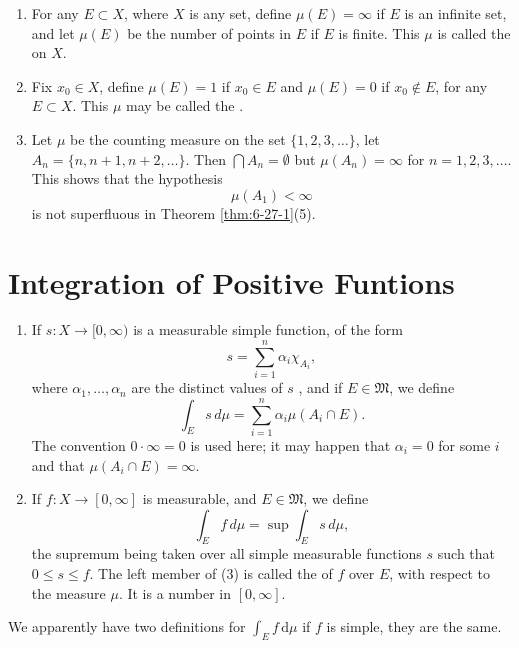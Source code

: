 \documentclass[../main.tex]{subfiles}
\begin{document}
\begin{example}{}{}
    \begin{enumerate}
\item For any $E \subset X$, where $X$ is any set, define $\mu(E) = \infty$ if $E$ is an infinite set, and let $\mu(E)$ be the number of points in $E$ if $E$ is finite. This $\mu$ is called the  on $X$.
\item Fix $x_0 \in X$, define $\mu(E) = 1$ if $x_0 \in E$ and $\mu(E) = 0$ if $x_0 \notin E$, for any $E \subset X$. This $\mu$ may be called the .
\item Let $\mu$ be the counting measure on the set $\{1, 2, 3, \dots\}$, let $A_n = \{n, n + 1, n + 2, \dots\}$. Then $\bigcap A_n = \emptyset$ but $\mu(A_n) = \infty$ for $n = 1, 2, 3, \dots$. This shows that the hypothesis
\[ \mu(A_1) < \infty \]
is not superfluous in Theorem \ref{thm:6-27-1}(5).
\end{enumerate}
\end{example}
\section{Integration of Positive Funtions}


\begin{definition}{}{}
\begin{enumerate}
    \item If $s: X \to [0, \infty)$ is a measurable simple function, of the form
\[
s = \sum_{i=1}^{n} \alpha_i \chi_{A_i},
\]
where $\alpha_1, \dots, \alpha_n$ are the distinct values of $s$ , and if $E \in \mathfrak{M}$, we define
\[
\int_E s \, d\mu = \sum_{i=1}^{n} \alpha_i \mu(A_i \cap E).
\]
The convention $0 \cdot \infty = 0$ is used here; it may happen that $\alpha_i = 0$ for some $i$ and that $\mu(A_i \cap E) = \infty$.
\item If $f: X \to [0, \infty]$ is measurable, and $E \in \mathfrak{M}$, we define
\[
\int_E f \, d\mu = \sup \int_E s \, d\mu,
\]
the supremum being taken over all simple measurable functions $s$ such that $0 \le s \le f$.
The left member of (3) is called the  of $f$ over $E$, with respect to the measure $\mu$. It is a number in $[0, \infty]$.
\end{enumerate}

\end{definition}
\begin{remark}
    We apparently have two definitions for \(  \int_{E}f\,\mathrm{d} \mu   \) if \(  f   \) is simple, they are the same.  
\end{remark}
\end{document}
